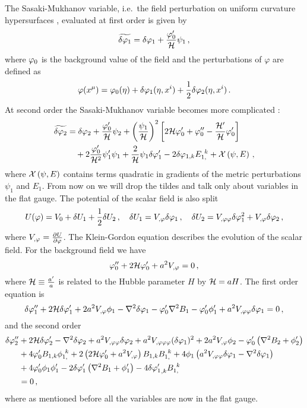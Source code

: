 The Sasaki-Mukhanov variable, i.e.\ the field perturbation on uniform curvature
hypersurfaces \cite{Sasaki:1986hm,Mukhanov:1988jd}, evaluated at first order is
given by
%  
\begin{equation}
\label{eq:Q1I-num}
\widetilde{\delta\varphi_{1}}=\delta\varphi_{1}+\frac{\varphi_{0}'}{\mathcal{H}}\psi_1\,, 
\end{equation}
% 
where $\varphi_0$ is the background value of the field and the perturbations of
$\varphi$ are defined as
%  
\begin{equation}
 \varphi(x^\mu) = \varphi_0(\eta) + \delta\varphi_{1}(\eta, x^i) + \frac{1}{2}\delta\varphi_{2}(\eta, x^i)
\,.
\end{equation}
% 
At second order the Sasaki-Mukhanov variable becomes more complicated
\cite{Malik:2005cy,Malik:2003mv}:
% 
\begin{align}
\label{eq:Q2I-num}
\widetilde{\delta\varphi_{2}} &= \delta\varphi_{2}+\frac{\varphi_{0}'}{\mathcal{H}}\psi_2
+\left(\frac{\psi_1}{\mathcal{H}}\right)^2\left[
2\mathcal{H}\varphi_{0}'+\varphi_{0}''-\frac{\mathcal{H}'}{\mathcal{H}}\varphi_{0}'\right] \nonumber\\
& \quad +2\frac{\varphi_{0}'}{\mathcal{H}^2}\psi_1'\psi_1+\frac{2}{\mathcal{H}}\psi_1\delta\varphi_{1}'
-2\delta\varphi_{1,k}E_{1,}^{~k}
+{\cal{X}}\left(\psi,E\right)\,,
\end{align}
% 
where ${\cal{X}}\left(\psi,E\right)$ contains terms quadratic in
gradients of the metric perturbations $\psi_1$ and $E_1$. From now on we will
drop the tildes and talk only about variables in the flat gauge.
The potential of the scalar field is also split
% 
\begin{equation}
 U(\varphi) = V_{0} + \delta U_{1} + \frac{1}{2}\delta U _{2}\,,\quad
 \delta U_{1} = V_{,\varphi} \delta\varphi_{1} \,,\quad
 \delta U_{2} = V_{,\varphi\varphi} \delta\varphi_{1}^2 + V_{,\varphi}\delta\varphi_{2} \,,
\end{equation}
% 
where $V_{,\varphi} = \frac{\partial U}{\partial \varphi}$.
The Klein-Gordon equation describes the evolution of the scalar field. For the
background field we have
%
\begin{equation}
\label{eq:KGback-num}
\varphi_{0}''+2\mathcal{H}\varphi_{0}'+a^2 V_{,\varphi} = 0\,,   
\end{equation}
%
where $\mathcal{H}\equiv\frac{a'}{a}$ is related to the Hubble parameter $H$ by $\mathcal{H}=aH$.
% 
The first order equation is
%
\begin{equation}
\label{eq:KGflatsingle-num}
\delta\varphi_{1}''+2\mathcal{H}\delta\varphi_{1}'+2a^2 V_{,\varphi} \phi_1
-\nabla^2\delta\varphi_{1}-\varphi_{0}'\nabla^2 B_1
-\varphi_{0}'\phi'_1 + a^2 V_{,\varphi\varphi} \delta\varphi_{1}
=0\,,
\end{equation}
%
and the second order
%
\begin{align}
\label{eq:KG2flatsingle-num}
\dvp2'' &+ 2\H\dvp2'-\nabla^2\dvp2+a^2 \Upp \dvp2
+ a^2 \Uppp (\dvp1)^2 +2a^2 \Uphi \phi_2
-\vp_{0}'\left(\nabla^2 B_2+\phi_2'\right)\nonumber\\
%
&+ 4\vp_{0}' B_{1,k}\phi_{1,}^{~k}
+2\left(2\H\vp_{0}'+a^2 \Uphi\right) B_{1,k}B_{1,}^{~k}
+4\phi_1\left(a^2 \Upp \dvp1-\nabla^2\dvp1\right) \nonumber\\
&+ 4\vp_{0}'\phi_1\phi_1'
-2\dvp1'\left(\nabla^2 B_1+\phi_1'\right)-4{\dvp1'}_{,k}B_{1,}^{~k} \nonumber \\
&= 0\,,
\end{align}
% 
where as mentioned before all the variables are now in the flat gauge.


